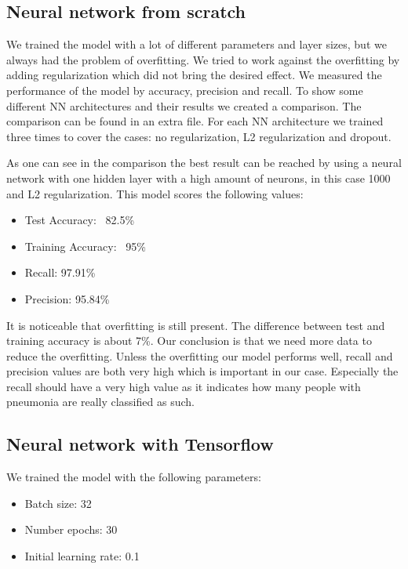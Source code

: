 \documentclass{article}
\begin{document}
\subsection{Neural network from scratch}
\label{sec:neural_network_from_scratch}

We trained the model with a lot of different parameters and layer sizes, 
but we always had the problem of overfitting. 
We tried to work against the overfitting by adding regularization which did not bring the desired effect. 
We measured the performance of the model by accuracy, precision and recall. 
To show some different NN architectures and their results we created a comparison. 
The comparison can be found in an extra file. 
For each NN architecture we trained three times to cover the cases: no regularization, L2 regularization and dropout.

As one can see in the comparison the best result can be reached by using a neural network 
with one hidden layer with a high amount of neurons, in this case 1000 and L2 regularization.
This model scores the following values:
\begin{itemize}
  \item Test Accuracy: ~82.5\%
  \item Training Accuracy: ~95\%
  \item Recall: 97.91\%
  \item Precision: 95.84\%
\end{itemize}

It is noticeable that overfitting is still present. The difference between test and training accuracy is about 7\%. 
Our conclusion is that we need more data to reduce the overfitting.
Unless the overfitting our model performs well, recall and precision values are both very high which is important in our case. 
Especially the recall should have a very high value as it indicates how many people with pneumonia are really classified as such.

\subsection{Neural network with Tensorflow}
\label{sec:neural_network_with_tensorflow}

We trained the model with the following parameters:
\begin{itemize}
  \item Batch size: 32
  \item Number epochs: 30
  \item Initial learning rate: 0.1
\end{itemize}
\end{document}
